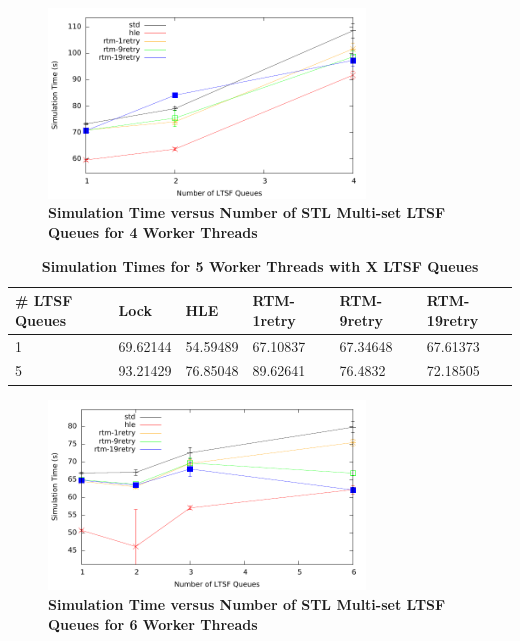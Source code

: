 \documentclass[11pt]{book}
\begin{document}
\begin{figure}[H]
    \centering
    \graphicspath{ {./figures/} }
    \includegraphics[width=0.75\textwidth,keepaspectratio]{hugeepidemicsim-NOmig-timeVSschedQs-multiset-4thread}
    \caption{\textbf{Simulation Time versus Number of STL Multi-set LTSF Queues
    for 4 Worker Threads}}
    \label{fig:noThrMig_timeVSschq_4threads}
\end{figure}

\begin{table}[H]
    \centering
    \begin{tabular}{l|p{2cm}|p{2cm}|p{2cm}|p{2cm}|p{2cm}}
        \textbf{\# LTSF Queues}&Lock &HLE &RTM-1retry &RTM-9retry &RTM-19retry \\
        \hline
        \midrule
            1 &69.62144  &54.59489 &67.10837 &67.34648 &67.61373\\ 
            5 &93.21429  &76.85048 &89.62641 &76.4832  &72.18505\\
    \end{tabular}
    \caption{\textbf{Simulation Times for 5 Worker Threads with X LTSF Queues}}
    \label{tab:noThrMig_5threadsXschq}
\end{table}

\begin{figure}[H]
    \centering
    \graphicspath{ {./figures/} }
    \includegraphics[width=0.75\textwidth,keepaspectratio]{hugeepidemicsim-NOmig-timeVSschedQs-multiset-6thread}
    \caption{\textbf{Simulation Time versus Number of STL Multi-set LTSF Queues
    for 6 Worker Threads}}
    \label{fig:noThrMig_timeVSschq_6threads}
\end{figure}
\end{document}
